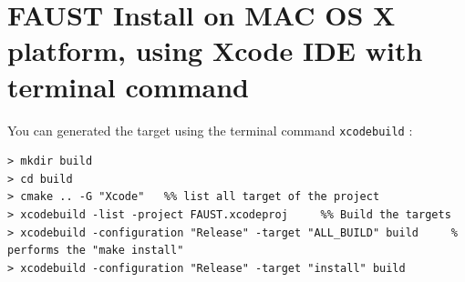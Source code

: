 \section{FAUST Install on MAC OS X platform, using Xcode IDE with terminal command}\label{sec:ANNEXEInstallMACXcodeTerminal}
You can generated the target using the terminal command \texttt{xcodebuild} :
\lstset{style=customBash}
\begin{lstlisting}
> mkdir build
> cd build
> cmake .. -G "Xcode"	%% list all target of the project
> xcodebuild -list -project FAUST.xcodeproj 	%% Build the targets
> xcodebuild -configuration "Release" -target "ALL_BUILD" build 	% performs the "make install"
> xcodebuild -configuration "Release" -target "install" build 
\end{lstlisting}


